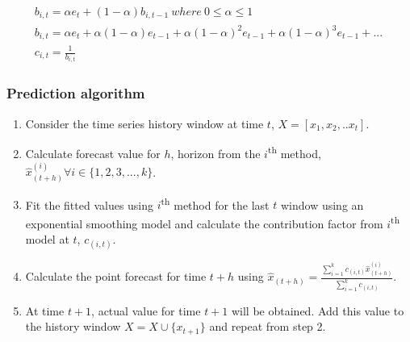 \begin{multline}
b_{i,t}= \alpha e_t + (1-\alpha)b_{i,t-1} \ where \ 0\leq \alpha \leq 1	\\ 
b_{i,t}=\alpha e_t + \alpha(1-\alpha)e_{t-1}+\alpha(1-\alpha)^2e_{t-1}+\alpha(1-\alpha)^3e_{t-1}+ . .. \  \\
 c_{i,t}=\frac{1}{b_{i,t}}
\end{multline}

\subsubsection{Prediction algorithm}

\begin{enumerate}
\item Consider the time series history window at time $t$, $X=[x_{1},x_{2},.. x_{t}]$.
\item Calculate forecast value for $h$, horizon from the $i$\textsuperscript{th} method, $\hat{x}_{(t+h)}^{(i)} \forall i \in \{1,2,3,...,k\}$.
\item Fit the fitted values using $i$\textsuperscript{th} method for the last $t$ window using an exponential smoothing model and calculate the contribution factor from $i$\textsuperscript{th} model at $t$, $c_(i,t)$.
\item Calculate the point forecast for time $t+h$ using 
$\hat{x}_{(t+h)}= \frac{\sum_{i=1}^{k}c_{(i,t)} \hat{x}_{(t+h)}^{(i)}}{\sum_{i=1}^{k}c_{(i,t)}}$.
\item At time $t+1$, actual value for time $t+1$ will be obtained. Add this value to the history window $X=X\cup \{x_{t+1}\}$ and repeat from step 2.
\end{enumerate}